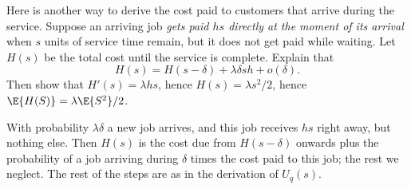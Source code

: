 \begin{exercise}
Here is another way to derive the cost paid to customers that arrive during the service.
Suppose an arriving job \emph{gets paid $hs$ directly at the moment of its arrival} when $s$ units of service time remain, but it does not get paid while waiting. Let $H(s)$ be the total cost until the service is complete. Explain that
\begin{equation*}
  H(s) = H(s-\delta) + \lambda \delta s h + o(\delta).
\end{equation*}
Then show that $H'(s) = \lambda h s$, hence $H(s) = \lambda s^{2}/2$, hence $\E{H(S)} = \lambda \E{S^{2}}/2$.
\begin{solution}
  With probability $\lambda \delta$ a new job arrives, and this job receives $h s$ right away, but nothing else.
  Then $H(s)$ is the cost due from $H(s-\delta)$ onwards plus the probability of a job arriving during $\delta$ times the cost paid to this job; the rest we neglect. The rest of the steps are as in the derivation of $U_{q}(s)$.
\end{solution}
\end{exercise}



